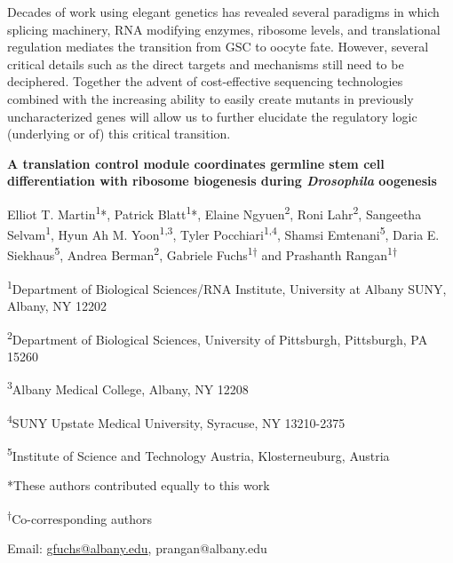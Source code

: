 \documentclass[12pt,twoside]{reedthesis}
\begin{document}
Decades of work using elegant genetics has revealed several paradigms in
which splicing machinery, RNA modifying enzymes, ribosome levels, and
translational regulation mediates the transition from GSC to oocyte
fate. However, several critical details such as the direct targets and
mechanisms still need to be deciphered. Together the advent of
cost-effective sequencing technologies combined with the increasing
ability to easily create mutants in previously uncharacterized genes
will allow us to further elucidate the regulatory logic (underlying or
of) this critical transition.

\textbf{A translation control module coordinates germline stem cell
differentiation with ribosome biogenesis during \emph{Drosophila} oogenesis}

Elliot T. Martin\textsuperscript{1}*, Patrick Blatt\textsuperscript{1}*, Elaine Ngyuen\textsuperscript{2}, Roni
Lahr\textsuperscript{2}, Sangeetha Selvam\textsuperscript{1}, Hyun Ah M. Yoon\textsuperscript{1,3}, Tyler
Pocchiari\textsuperscript{1,4}, Shamsi Emtenani\textsuperscript{5}, Daria E. Siekhaus\textsuperscript{5}, Andrea
Berman\textsuperscript{2}, Gabriele Fuchs\textsuperscript{1†} and Prashanth Rangan\textsuperscript{1†}

\textsuperscript{1}Department of Biological Sciences/RNA Institute, University at Albany
SUNY, Albany, NY 12202

\textsuperscript{2}Department of Biological Sciences, University of Pittsburgh,
Pittsburgh, PA 15260

\textsuperscript{3}Albany Medical College, Albany, NY 12208

\textsuperscript{4}SUNY Upstate Medical University, Syracuse, NY 13210-2375

\textsuperscript{5}Institute of Science and Technology Austria, Klosterneuburg, Austria

*These authors contributed equally to this work

\textsuperscript{†}Co-corresponding authors

Email: \href{mailto:gfuchs@albany.edu}{{gfuchs@albany.edu}},
{prangan@albany.edu}
\end{document}
